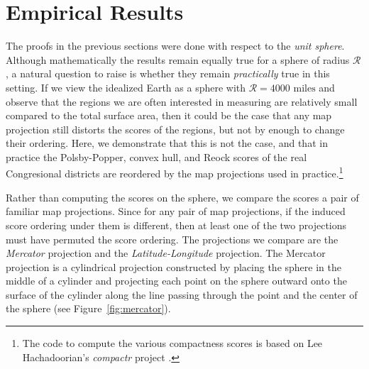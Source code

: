 \section{Empirical Results}\label{sec:exper}




The proofs in the previous sections were done with respect to the \textit{unit sphere}.  Although mathematically the results remain equally true for a sphere of radius $\mathcal{R}$, a natural question to raise is whether they remain \textit{practically} true in this setting.  If we view the idealized Earth as a sphere with  $\mathcal{R}=4000\text{ miles}$ and observe that the regions we are often interested in measuring are relatively small compared to the total surface area, then it could be the case that any map projection still distorts the scores of the regions, but not by enough to change their ordering.  Here, we demonstrate that this is not the case, and that in practice the Polsby-Popper, convex hull, and Reock scores of the real Congresional districts are reordered by the map projections used in practice.\footnote{The code to compute the various compactness scores is based on Lee Hachadoorian's \textit{compactr} project \cite{hachadoorian2018reock}.}

Rather than computing the scores on the sphere, we compare the scores a pair of familiar map projections.  Since for any pair of map projections, if the induced score ordering under them is different, then at least one of the two projections must have permuted the score ordering.  The projections we compare are the \textit{Mercator} projection and the \textit{Latitude-Longitude} projection.  The Mercator projection is a cylindrical projection constructed by placing the sphere in the middle of a cylinder and projecting each point on the sphere outward onto the surface of the cylinder along the line passing through the point and the center of the sphere (see Figure~\ref{fig:mercator}).

